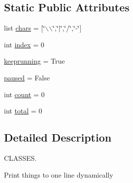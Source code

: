 \subsection*{\-Static \-Public \-Attributes}
\begin{DoxyCompactItemize}
\item 
list \hyperlink{classalldbpediapoints_1_1cSpinner_a8826297138ce30b32ee302671dfb3226}{chars} = \mbox{[}\char`\"{}$\backslash$$\backslash$\char`\"{},\char`\"{}$|$\char`\"{},\char`\"{}/\char`\"{},\char`\"{}-\/\char`\"{}\mbox{]}
\item 
int \hyperlink{classalldbpediapoints_1_1cSpinner_a0dc56f8aa6b26ed65ba4c5acb640e888}{index} = 0
\item 
\hyperlink{classalldbpediapoints_1_1cSpinner_a85de1d06f8566704c1d9be095481528c}{keeprunning} = \-True
\item 
\hyperlink{classalldbpediapoints_1_1cSpinner_a89e9e5c551cabfb28b2adfa3dc838c54}{paused} = \-False
\item 
int \hyperlink{classalldbpediapoints_1_1cSpinner_a49c76585f4093eaa0dc7f8f4057d63e2}{count} = 0
\item 
int \hyperlink{classalldbpediapoints_1_1cSpinner_a41860d252c7864df06d05adb2405ff1b}{total} = 0
\end{DoxyCompactItemize}


\subsection{\-Detailed \-Description}
\-C\-L\-A\-S\-S\-E\-S. 

\begin{DoxyVerb}
    Print things to one line dynamically
\end{DoxyVerb}
 

